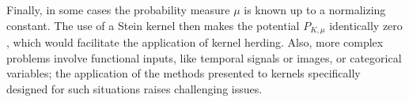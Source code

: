 Finally, in some cases the probability measure $\mu$ is known up to a normalizing constant. 
The use of a Stein kernel then makes the potential $P_{K,\mu}$ identically zero \cite{ChenMGBO2018,ChenBBGGMO2019}, which would facilitate the application of kernel herding. 
Also, more complex problems involve functional inputs, like temporal signals or images, or categorical variables; the application of the methods presented to kernels specifically designed for such situations raises challenging issues.






